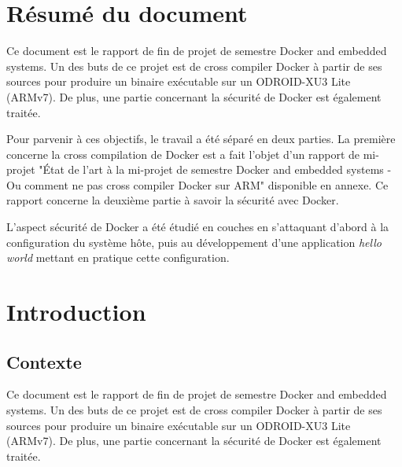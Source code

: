 \documentclass[11pt,a4paper,oneside]{report}
\newcommand{\oldreportname}{État de l’art à la mi-projet de semestre Docker and embedded systems - Ou comment ne pas cross compiler Docker sur ARM}
\newcommand{\odroid}{ODROID-XU3 Lite }
\begin{document}
\pagestyle{historystyle}
\begin{versionhistory}
\end{versionhistory}


\chapter{Résumé du document}
Ce document est le rapport de fin de projet de semestre Docker and embedded systems. Un des buts de ce projet est de cross compiler Docker à partir de ses sources pour produire un binaire exécutable sur un \odroid (ARMv7). De plus, une partie concernant la sécurité de Docker est également traitée.

Pour parvenir à ces objectifs, le travail a été séparé en deux parties. La première concerne la cross compilation de Docker est a fait l'objet d'un rapport de mi-projet "\oldreportname" disponible en annexe. Ce rapport concerne la deuxième partie à savoir la sécurité avec Docker. 

L'aspect sécurité de Docker a été étudié en couches en s'attaquant d'abord à la configuration du système hôte, puis au développement d'une application \textit{hello world} mettant en pratique cette configuration.

\tableofcontents
{}

\pagestyle{normal}

\chapter{Introduction}

\section{Contexte}\label{contexte}

Ce document est le rapport de fin de projet de semestre Docker and embedded systems. Un des buts de ce projet est de cross compiler Docker à partir de ses sources pour produire un binaire exécutable sur un \odroid (ARMv7). De plus, une partie concernant la sécurité de Docker est également traitée.
\end{document}
